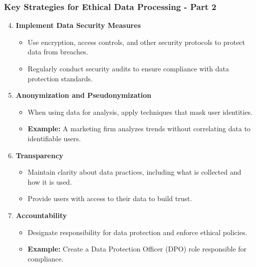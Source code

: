 \documentclass[aspectratio=169]{beamer}
\begin{document}
\begin{frame}[fragile]
    \frametitle{Key Strategies for Ethical Data Processing - Part 2}
    \begin{enumerate}
        \setcounter{enumi}{3} %
        \item \textbf{Implement Data Security Measures}
            \begin{itemize}
                \item Use encryption, access controls, and other security protocols to protect data from breaches.
                \item Regularly conduct security audits to ensure compliance with data protection standards.
            \end{itemize}
        
        \item \textbf{Anonymization and Pseudonymization}
            \begin{itemize}
                \item When using data for analysis, apply techniques that mask user identities.
                \item \textbf{Example:} A marketing firm analyzes trends without correlating data to identifiable users.
            \end{itemize}

        \item \textbf{Transparency}
            \begin{itemize}
                \item Maintain clarity about data practices, including what is collected and how it is used.
                \item Provide users with access to their data to build trust.
            \end{itemize}

        \item \textbf{Accountability}
            \begin{itemize}
                \item Designate responsibility for data protection and enforce ethical policies.
                \item \textbf{Example:} Create a Data Protection Officer (DPO) role responsible for compliance.
            \end{itemize}
    \end{enumerate}
\end{frame}
\end{document}
